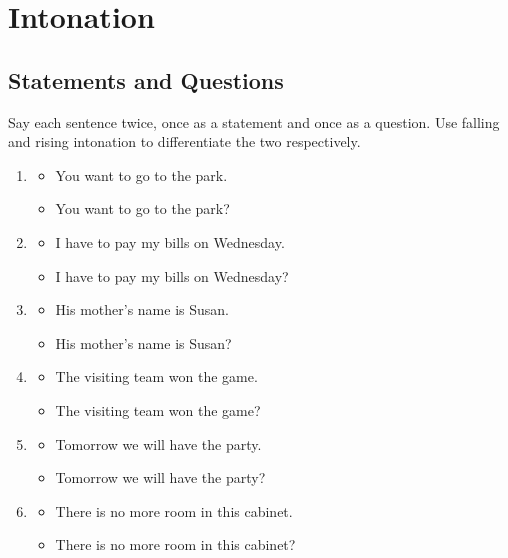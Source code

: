 \documentclass[12pt]{article}
\begin{document}
\pagebreak
\section*{Intonation}
\subsection*{Statements and Questions}
Say each sentence twice, once as a statement and once as a question. Use falling and rising intonation to differentiate the two respectively.
\begin{enumerate}
\item
\begin{itemize}
\item You want to go to the park.
\item You want to go to the park?
\end{itemize}

\item
\begin{itemize}
\item I have to pay my bills on Wednesday.
\item I have to pay my bills on Wednesday?
\end{itemize}

\item
\begin{itemize}
\item His mother's name is Susan.
\item His mother's name is Susan?
\end{itemize}

\item
\begin{itemize}
\item The visiting team won the game.
\item The visiting team won the game?
\end{itemize}

\item 
\begin{itemize}
\item Tomorrow we will have the party.
\item Tomorrow we will have the party?
\end{itemize}

\item
\begin{itemize}
\item There is no more room in this cabinet.
\item There is no more room in this cabinet?
\end{itemize}


\end{enumerate}
\end{document}
